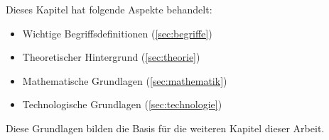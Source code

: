 Dieses Kapitel hat folgende Aspekte behandelt:
\begin{itemize}
    \item Wichtige Begriffsdefinitionen (\autoref{sec:begriffe})
    \item Theoretischer Hintergrund (\autoref{sec:theorie})
    \item Mathematische Grundlagen (\autoref{sec:mathematik})
    \item Technologische Grundlagen (\autoref{sec:technologie})
\end{itemize}

Diese Grundlagen bilden die Basis für die weiteren Kapitel dieser Arbeit.


